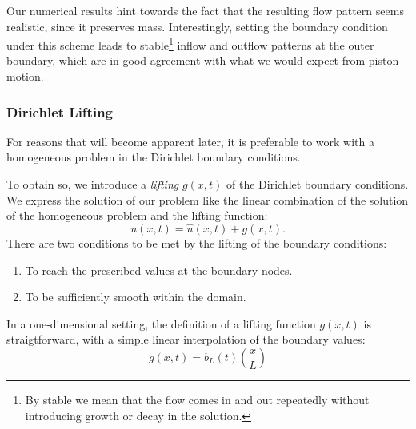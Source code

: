 \documentclass[../../thesis.tex]{subfiles}
\begin{document}
Our numerical results hint towards the fact that the resulting flow pattern seems realistic, 
since it preserves mass.
Interestingly, setting the boundary condition under this scheme 
leads to stable\footnote{
    By stable we mean that the flow comes in and out repeatedly without introducing
    growth or decay in the solution.
}
inflow and outflow patterns at the outer boundary, 
which are in good agreement with what we would expect from piston motion.


\subsubsection{Dirichlet Lifting}
\label{sec:1d_fom_heat_equation_dirichlet_lifting}
For reasons that will become apparent later, it is preferable to work with a homogeneous problem in the Dirichlet boundary conditions.

To obtain so, we introduce a \emph{lifting} $g(x,t)$ of the Dirichlet boundary conditions.
We express the solution of our problem like the linear combination of the solution of the homogeneous problem and the lifting function:
\begin{equation}
    \label{eq:1d_fom_homogeneous_plus_lifting}
    u(x,t) = \hat{u}(x,t) + g(x,t).
\end{equation}
There are two conditions to be met by the lifting of the boundary conditions:
\begin{enumerate}
    \item To reach the prescribed values at the boundary nodes.
    \item To be sufficiently smooth within the domain.
\end{enumerate}
In a one-dimensional setting, the definition of a lifting function $g(x,t)$ is straigtforward, with a simple linear interpolation of the boundary values:
\begin{equation}
    \label{eq:1d_fom_dirichlet_lifting}
    g(x,t) = b_L(t) \left(\frac{x}{L}\right)
\end{equation}
\end{document}
